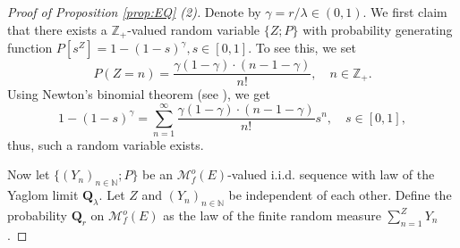 \documentclass[12pt,a4paper]{amsart}
\numberwithin{equation}{section}
\theoremstyle{plain}
\theoremstyle{definition}
\theoremstyle{remark}
\begin{document}
\begin{proof}[Proof of Proposition \ref{prop:EQ} (2)]
	Denote by $\gamma = r / \lambda \in (0,1)$.
	We first claim that there exists a
	$\mathbb Z_+$-valued
	random variable $\{Z;P\}$ with probability generating function $P[s^Z] = 1 - (1- s)^{\gamma}, s\in [0,1]$. To see this, we set
	\[
	P(Z = n) = \frac{\gamma(1-\gamma ) \cdot (n-1-\gamma  )}{n!},
	\quad n \in \mathbb Z_+.
	\]
	Using Newton's binomial theorem (see \cite[Exercise 8.22]{Rudin1976Principles}), we get
	\[
	1 - (1 - s)^\gamma = \sum_{n = 1}^\infty \frac{\gamma (1-\gamma)\cdot (n-1-\gamma )}{n!} s^n, \quad s\in [0,1],
	\]
thus, such a random variable exists.
	
	Now let $\{(Y_n)_{n \in \mathbb N}; P\}$
	be an $\mathcal M^o_f(E)$-valued i.i.d. sequence
	with law of the Yaglom limit $\mathbf Q_\lambda$.
	Let $Z$ and $(Y_n)_{n\in \mathbb N}$ be independent of each other.
	Define the probability $\mathbf Q_r$ on $\mathcal M^o_f(E)$ as the law of the finite random measure $\sum_{n=1}^Z Y_n$.
	

\end{proof}
\end{document}
